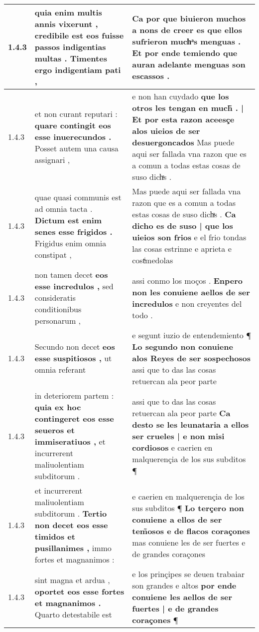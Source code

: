 \begin{tabular}{|p{1cm}|p{6.5cm}|p{6.5cm}|}
1.4.3 & quia enim multis annis vixerunt , \textbf{ credibile est eos fuisse passos indigentias multas . } Timentes ergo indigentiam pati , & Ca por que biuieron muchos a nons de creer es \textbf{ que ellos sufrieron muchͣs menguas . } Et por ende temiendo que auran adelante menguas son escassos . \\\hline
1.4.3 & et non curant reputari : \textbf{ quare contingit eos esse inuerecundos . } Posset autem una causa assignari , & e non han cuydado \textbf{ que los otros les tengan en much̃ . | Et por esta razon aceesçe alos uieios de ser desuergoncados } Mas puede aqui ser fallada vna razon que es a comun a todas estas cosas de suso dichͣs . \\\hline
1.4.3 & quae quasi communis est ad omnia tacta . \textbf{ Dictum est enim senes esse frigidos . } Frigidus enim omnia constipat , & Mas puede aqui ser fallada vna razon que es a comun a todas estas cosas de suso dichͣs . \textbf{ Ca dicho es de suso | que los uieios son frios } e el frio tondas las cosas estrinne e aprieta e costͥmedolas \\\hline
1.4.3 & non tamen decet \textbf{ eos esse incredulos , } sed consideratis conditionibus personarum , & assi conmo los moços . \textbf{ Enpero non les conuiene aellos de ser incredulos } e non creyentes del todo . \\\hline
1.4.3 & Secundo non decet \textbf{ eos esse suspitiosos , } ut omnia referant & e segunt iuzio de entendemiento ¶ \textbf{ Lo segundo non conuiene alos Reyes de ser sospechosos } assi que to das las cosas retuercan ala peor parte \\\hline
1.4.3 & in deteriorem partem : \textbf{ quia ex hoc contingeret eos esse seueros et immiseratiuos , } et incurrerent maliuolentiam subditorum . & assi que to das las cosas retuercan ala peor parte \textbf{ Ca desto se les leunataria a ellos ser crueles | e non misi cordiosos } e caerien en malquerençia de los sus subditos ¶ \\\hline
1.4.3 & et incurrerent maliuolentiam subditorum . \textbf{ Tertio non decet eos esse timidos et pusillanimes , } immo fortes et magnanimos : & e caerien en malquerençia de los sus subditos ¶ \textbf{ Lo terçero non conuiene a ellos de ser tem̃osos e de flacos coraçones } mas conuiene les de ser fuertes e de grandes coraçones \\\hline
1.4.3 & sint magna et ardua , \textbf{ oportet eos esse fortes et magnanimos . } Quarto detestabile est & e los prinçipes se deuen trabaiar son grandes e altos \textbf{ por ende conuiene les aellos de ser fuertes | e de grandes coraçones } ¶ \\\hline

\end{tabular}
